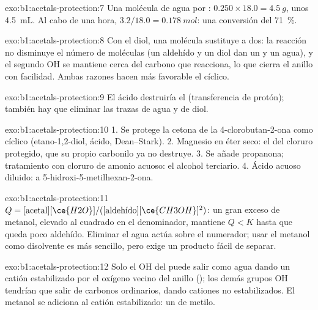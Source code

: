 \begin{solution}{exo:b1:acetals-protection:7}
Una molécula de agua por : $0.250 \times 18.0 = \qty{4.5}{g}$, unos
\qty{4.5}{mL}. Al cabo de una hora, $3.2/18.0 = \qty{0.178}{mol}$: una
conversión del \qty{71}{\percent}.
\end{solution}

\begin{solution}{exo:b1:acetals-protection:8}
Con el diol, una molécula sustituye a dos: la reacción no disminuye el
número de moléculas (un aldehído y un diol dan un  y un agua), y el
segundo OH se mantiene cerca del carbono que reacciona, lo que cierra el
anillo con facilidad. Ambas razones hacen más favorable el  cíclico.
\end{solution}

\begin{solution}{exo:b1:acetals-protection:9}
El ácido destruiría el  (transferencia de protón);
también hay que eliminar las trazas de agua y de diol.
\end{solution}

\begin{solution}{exo:b1:acetals-protection:10}
1. Se protege la cetona de la 4-clorobutan-2-ona como  cíclico
(etano-1,2-diol,  ácido, Dean--Stark). 2. Magnesio en éter
seco: el  del cloruro protegido, que su propio
carbonilo ya no destruye. 3. Se añade propanona; tratamiento con cloruro
de amonio acuoso: el alcohol terciario. 4. Ácido acuoso diluido:
 a 5-hidroxi-5-metilhexan-2-ona.
\end{solution}

\begin{solution}{exo:b1:acetals-protection:11}
$Q = [\text{acetal}][\ce{H2O}]/([\text{aldehído}][\ce{CH3OH}]^2)$: un gran
exceso de metanol, elevado al cuadrado en el denominador, mantiene
$Q < K$ hasta que queda poco aldehído. Eliminar el agua actúa sobre el
numerador; usar el metanol como disolvente es más sencillo, pero exige un
producto fácil de separar.
\end{solution}

\begin{solution}{exo:b1:acetals-protection:12}
Solo el OH del  puede salir como agua dando un catión
estabilizado por el oxígeno vecino del anillo (); los demás
grupos OH tendrían que salir de carbonos ordinarios, dando cationes no
estabilizados. El metanol se adiciona al catión estabilizado: un 
de metilo.
\end{solution}

